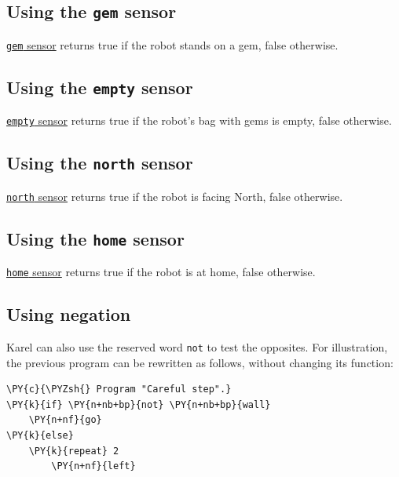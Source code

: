 \subsection{Using the {\tt gem} sensor}

\underline{{\tt gem} sensor} returns true if the robot stands on a gem, false otherwise. \\

\subsection{Using the {\tt empty} sensor}

\underline{{\tt empty} sensor} returns true if the robot's bag with gems is empty, false otherwise. \\

\subsection{Using the {\tt north} sensor}

\underline{{\tt north} sensor} returns true if the robot is facing North, false otherwise.\\

\subsection{Using the {\tt home} sensor}

\underline{{\tt home} sensor} returns true if the robot is at home, false otherwise.

\subsection{Using negation}

Karel can also use the reserved word {\tt not} to test the opposites.
For illustration, the previous program can be rewritten as follows, without 
changing its function:\\

\begin{bbox}
\begin{Verbatim}[commandchars=\\\{\}]
\PY{c}{\PYZsh{} Program "Careful step".}
\PY{k}{if} \PY{n+nb+bp}{not} \PY{n+nb+bp}{wall}
    \PY{n+nf}{go}
\PY{k}{else}
    \PY{k}{repeat} 2
        \PY{n+nf}{left}
\end{Verbatim}
\end{bbox}
\vspace{6mm}

